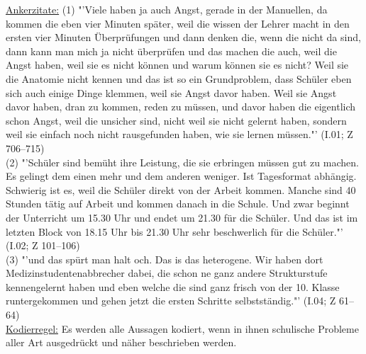 \underline{Ankerzitate:} (1) "'Viele haben ja auch Angst, gerade in der Manuellen, da kommen die eben vier Minuten später, weil die wissen der Lehrer macht in den ersten vier Minuten Überprüfungen und dann denken die, wenn die nicht da sind, dann kann man mich ja nicht überprüfen und das machen die auch, weil die Angst haben, weil sie es nicht können und warum können sie es nicht? Weil sie die Anatomie nicht kennen und das ist so ein Grundproblem, dass Schüler eben sich auch einige Dinge klemmen, weil sie Angst davor haben. Weil sie Angst davor haben, dran zu kommen, reden zu müssen, und davor haben die eigentlich schon Angst, weil die unsicher sind, nicht weil sie nicht gelernt haben, sondern weil sie einfach noch nicht rausgefunden haben, wie sie lernen müssen."' (I.01; Z 706--715)\\
(2) "'Schüler sind bemüht ihre Leistung, die sie erbringen müssen gut zu machen. Es gelingt dem einen mehr und dem anderen weniger. Ist Tagesformat abhängig. Schwierig ist es, weil die Schüler direkt von der Arbeit kommen. Manche sind 40 Stunden tätig auf Arbeit und kommen danach in die Schule. Und zwar beginnt der Unterricht um 15.30 Uhr und endet um 21.30 für die Schüler. Und das ist im letzten Block von 18.15 Uhr bis 21.30 Uhr sehr beschwerlich für die Schüler."' (I.02; Z 101--106)\\ (3) "'und das spürt man halt och. Das is das heterogene. Wir haben dort Medizinstudentenabbrecher dabei, die schon ne ganz andere Strukturstufe kennengelernt haben und eben welche die sind ganz frisch von der 10. Klasse runtergekommen und gehen jetzt die ersten Schritte selbstständig."' (I.04; Z 61--64)\\
\underline{Kodierregel:} Es werden alle Aussagen kodiert, wenn in ihnen schulische Probleme aller Art ausgedrückt und näher beschrieben werden.\\

